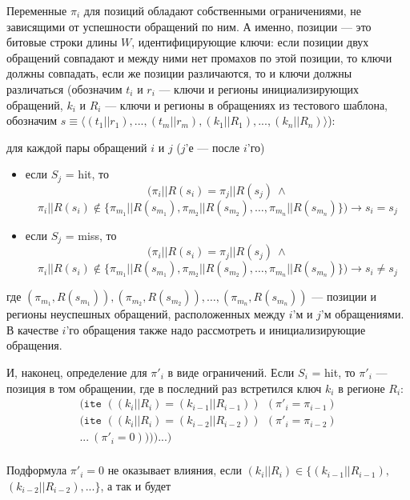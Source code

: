 \begin{enumerate}
Переменные $\pi_i$ для позиций обладают собственными ограничениями, не зависящими от успешности обращений по ним. А именно, позиции --- это битовые строки длины $W$, идентифицирующие ключи: если позиции двух обращений совпадают и между ними нет промахов по этой позиции, то ключи должны совпадать, если же позиции различаются, то и ключи должны различаться (обозначим $t_i$ и $r_i$ --- ключи и регионы инициализирующих обращений, $k_i$ и $R_i$ --- ключи и регионы в обращениях из тестового шаблона, обозначим $s \equiv \langle (t_1||r_1), ..., (t_m||r_m), (k_1||R_1), ..., (k_n||R_n)\rangle$):

для каждой пары обращений $i$ и $j$ ($j$'е --- после $i$'го)
\begin{itemize}
    \item если $S_j$ = hit, то $$(\pi_i||R(s_i) = \pi_j||R(s_j)~\wedge$$ $$\pi_i||R(s_i) \notin \{\pi_{m_1}||R(s_{m_1}), \pi_{m_2}||R(s_{m_2}), \dots, \pi_{m_n}||R(s_{m_n})\}) \rightarrow s_i = s_j$$
    \item если $S_j$ = miss, то $$(\pi_i||R(s_i) = \pi_j||R(s_j)~\wedge$$ $$\pi_i||R(s_i) \notin \{\pi_{m_1}||R(s_{m_1}), \pi_{m_2}||R(s_{m_2}), \dots, \pi_{m_n}||R(s_{m_n})\}) \rightarrow s_i \neq s_j$$
\end{itemize}
где $(\pi_{m_1},R(s_{m_1})), (\pi_{m_2},R(s_{m_2})), \dots, (\pi_{m_n},R(s_{m_n}))$ --- позиции и регионы неуспешных обращений,
расположенных между $i$'м и $j$'м обращениями. В качестве $i$'го обращения также надо рассмотреть и инициализирующие обращения.


И, наконец, определение для $\pi'_i$ в виде ограничений. Если $S_i$ = hit, то  $\pi'_i$ --- позиция в том обращении, где в последний раз встретился ключ $k_i$ в регионе $R_i$:
$$
\begin{array}{l}
\texttt{(ite~} ((k_i||R_i) = (k_{i-1}||R_{i-1})) ~~ (\pi'_i = \pi_{i-1})\\
\texttt{(ite~} ((k_i||R_i) = (k_{i-2}||R_{i-2})) ~~ (\pi'_i = \pi_{i-2})\\
... ~(\pi'_i = 0)\texttt{)))...)}\\
\end{array}
$$

Подформула $\pi'_i = 0$ не оказывает влияния, если $(k_i||R_i) \in \{(k_{i-1}||R_{i-1}),$ $(k_{i-2}||R_{i-2}), ... \}$, а так и будет


\end{enumerate}
